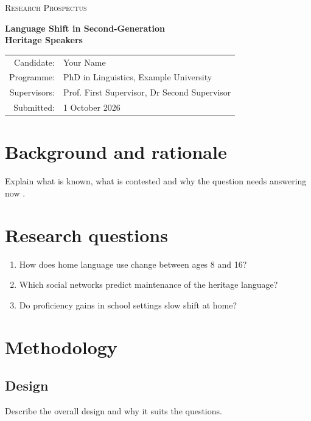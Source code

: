 \documentclass[11pt,a4paper]{article}
\begin{document}
\begin{center}
{\small\textsc{Research Prospectus}\par}
\vspace{0.5em}
{\LARGE\bfseries Language Shift in Second-Generation\\ Heritage Speakers\par}
\vspace{1em}
\begin{tabular}{rl}
Candidate: & Your Name \\
Programme: & PhD in Linguistics, Example University \\
Supervisors: & Prof. First Supervisor, Dr Second Supervisor \\
Submitted: & 1 October 2026 \\
\end{tabular}
\end{center}

\vspace{1em}
\noindent{}

\section{Background and rationale}
Explain what is known, what is contested and why the question needs answering now \cite{p1}.

\section{Research questions}
\begin{enumerate}[label=\textbf{RQ\arabic*.},leftmargin=*]
  \item How does home language use change between ages 8 and 16?
  \item Which social networks predict maintenance of the heritage language?
  \item Do proficiency gains in school settings slow shift at home?
\end{enumerate}

\section{Methodology}
\subsection{Design}
Describe the overall design and why it suits the questions.
\end{document}
